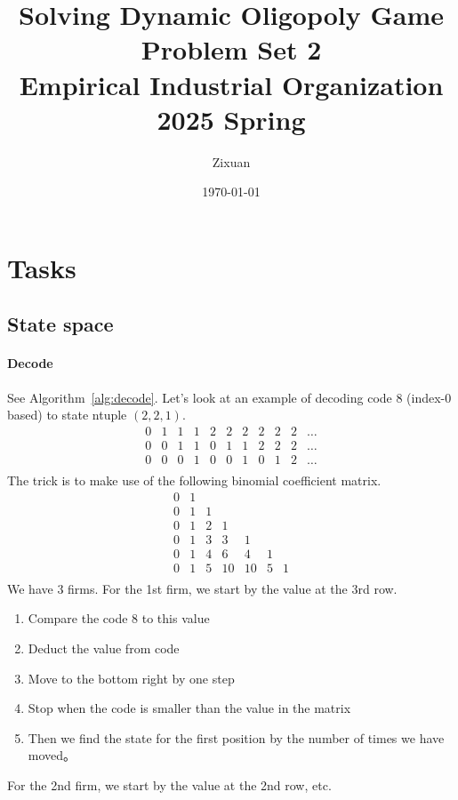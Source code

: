 \documentclass[12pt]{article}[margin=1in]
\title{\textbf{Solving Dynamic Oligopoly Game} \\
    \vspace{.3cm}
    \large Problem Set 2 \\
    Empirical Industrial Organization 2025 Spring}
\author{Zixuan}
\date{\today}
\begin{document}
\maketitle

\setcounter{page}{1}

\section{Tasks}
\subsection{State space}
\paragraph{Decode} See Algorithm~\ref{alg:decode}. Let's look at an example of decoding code 8 (index-0 based) to state ntuple $(2,2,1)$.
\begin{equation*}
    \begin{array}{cccccccccccc}
        0 & 1 & 1 & 1 & 2 & 2 & 2 & 2 & 2 & 2 & \ldots \\
        0 & 0 & 1 & 1 & 0 & 1 & 1 & 2 & 2 & 2 & \ldots \\
        0 & 0 & 0 & 1 & 0 & 0 & 1 & 0 & 1 & 2 & \ldots \\
    \end{array}
\end{equation*}
The trick is to make use of the following binomial coefficient matrix.
\begin{equation*}
    \begin{array}{ccccccc}
        0 & 1 &   &    &            \\
        0 & 1 & 1 &    &            \\
        0 & 1 & 2 & 1  &            \\
        0 & 1 & 3 & 3  & 1          \\
        0 & 1 & 4 & 6  & 4  & 1     \\
        0 & 1 & 5 & 10 & 10 & 5 & 1 \\
    \end{array}
\end{equation*}
We have 3 firms. For the 1st firm, we start by the value at the 3rd row.
\begin{enumerate}
    \item Compare the code 8 to this value
    \item Deduct the value from code
    \item Move to the bottom right by one step
    \item Stop when the code is smaller than the value in the matrix
    \item Then we find the state for the first position by the number of times we have moved。
\end{enumerate}
For the 2nd firm, we start by the value at the 2nd row, etc.
\end{document}
